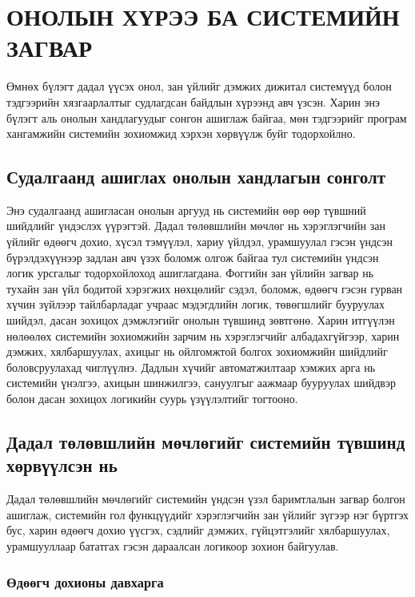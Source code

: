 ﻿\chapter{ОНОЛЫН ХҮРЭЭ БА СИСТЕМИЙН ЗАГВАР}

Өмнөх бүлэгт дадал үүсэх онол, зан үйлийг дэмжих дижитал системүүд болон тэдгээрийн хязгаарлалтыг судлагдсан байдлын хүрээнд авч үзсэн. Харин энэ бүлэгт аль онолын хандлагуудыг сонгон ашиглаж байгаа, мөн тэдгээрийг програм хангамжийн системийн зохиомжид хэрхэн хөрвүүлж буйг тодорхойлно.

\section{Судалгаанд ашиглах онолын хандлагын сонголт}

Энэ судалгаанд ашигласан онолын аргууд нь системийн өөр өөр түвшний шийдлийг үндэслэх үүрэгтэй. Дадал төлөвшлийн мөчлөг нь хэрэглэгчийн зан үйлийг өдөөгч дохио, хүсэл тэмүүлэл, хариу үйлдэл, урамшуулал гэсэн үндсэн бүрэлдэхүүнээр задлан авч үзэх боломж олгож байгаа тул системийн үндсэн логик урсгалыг тодорхойлоход ашиглагдана. Фоггийн зан үйлийн загвар нь тухайн зан үйл бодитой хэрэгжих нөхцөлийг сэдэл, боломж, өдөөгч гэсэн гурван хүчин зүйлээр тайлбарладаг учраас мэдэгдлийн логик, төвөгшлийг бууруулах шийдэл, дасан зохицох дэмжлэгийг онолын түвшинд зөвтгөнө. Харин итгүүлэн нөлөөлөх системийн зохиомжийн зарчим нь хэрэглэгчийг албадахгүйгээр, харин дэмжих, хялбаршуулах, ахицыг нь ойлгомжтой болгох зохиомжийн шийдлийг боловсруулахад чиглүүлнэ. Дадлын хүчийг автоматжилтаар хэмжих арга нь системийн үнэлгээ, ахицын шинжилгээ, сануулгыг аажмаар бууруулах шийдвэр болон дасан зохицох логикийн суурь үзүүлэлтийг тогтооно.

\section{Дадал төлөвшлийн мөчлөгийг системийн түвшинд хөрвүүлсэн нь}

Дадал төлөвшлийн мөчлөгийг системийн үндсэн үзэл баримтлалын загвар болгон ашиглаж, системийн гол функцүүдийг хэрэглэгчийн зан үйлийг зүгээр нэг бүртгэх бус, харин өдөөгч дохио үүсгэх, сэдлийг дэмжих, гүйцэтгэлийг хялбаршуулах, урамшууллаар бататгах гэсэн дараалсан логикоор зохион байгуулав.

\subsection{Өдөөгч дохионы давхарга}

